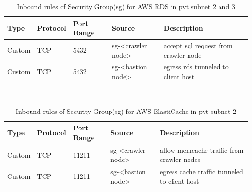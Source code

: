\pagebreak

\begin{center}
  \begin{table}[h!]
  \begin{tabular}{| l | l | l | l | p{5cm} |}
    \textbf{Type} & \textbf{Protocol} & \textbf{Port Range} & \textbf{Source} & \textbf{Description} \\
    \hline
    Custom & TCP & 5432 & sg-<crawler node> & accept sql request from crawler node \\
    \hline
    Custom & TCP & 5432 & sg-<bastion node> & egress rds tunneled to client host \\
  \end{tabular}
  \caption{Inbound rules of Security Group(sg) for AWS RDS in pvt subnet 2 and 3}
  \end{table}
\end{center}
\\
\begin{center}
  \begin{table}[h!]
  \begin{tabular}{| l | l | l | l | p{5cm} |}
    \textbf{Type} & \textbf{Protocol} & \textbf{Port Range} & \textbf{Source} & \textbf{Description} \\
    \hline
    Custom & TCP & 11211 & sg-<crawler node> & allow memcache traffic from crawler nodes \\
    \hline
    Custom & TCP & 11211 & sg-<bastion node> & egress cache traffic tunneled to client host \\
  \end{tabular}
  \caption{Inbound rules of Security Group(sg) for AWS ElastiCache in pvt subnet 2}
  \end{table}
\end{center}

\pagebreak

